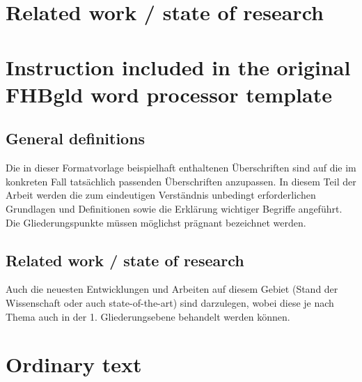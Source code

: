 \section{Related work / state of research}


















\section{Instruction included in the original FHBgld word processor template}
\subsection{General definitions}
Die in dieser Formatvorlage beispielhaft enthaltenen Überschriften sind auf die im
konkreten Fall tatsächlich passenden Überschriften anzupassen.
In diesem Teil der Arbeit werden die zum eindeutigen Verständnis unbedingt
erforderlichen Grundlagen und Definitionen sowie die Erklärung wichtiger Begriffe
angeführt.
Die Gliederungspunkte müssen möglichst prägnant bezeichnet werden.
\subsection{Related work / state of research}
Auch die neuesten Entwicklungen und Arbeiten auf diesem Gebiet (Stand der
Wissenschaft oder auch state-of-the-art) sind darzulegen, wobei diese je nach Thema
auch in der 1. Gliederungsebene behandelt werden können.

\section{Ordinary text}


